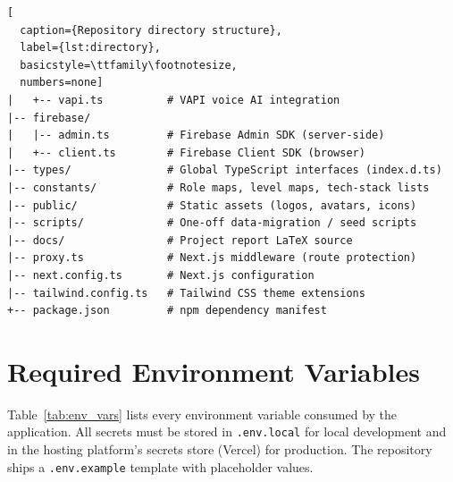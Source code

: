 \begin{lstlisting}[
  caption={Repository directory structure},
  label={lst:directory},
  basicstyle=\ttfamily\footnotesize,
  numbers=none]
|   +-- vapi.ts          # VAPI voice AI integration
|-- firebase/
|   |-- admin.ts         # Firebase Admin SDK (server-side)
|   +-- client.ts        # Firebase Client SDK (browser)
|-- types/               # Global TypeScript interfaces (index.d.ts)
|-- constants/           # Role maps, level maps, tech-stack lists
|-- public/              # Static assets (logos, avatars, icons)
|-- scripts/             # One-off data-migration / seed scripts
|-- docs/                # Project report LaTeX source
|-- proxy.ts             # Next.js middleware (route protection)
|-- next.config.ts       # Next.js configuration
|-- tailwind.config.ts   # Tailwind CSS theme extensions
+-- package.json         # npm dependency manifest
\end{lstlisting}

\section{Required Environment Variables}
\label{app:env}

Table~\ref{tab:env_vars} lists every environment variable consumed by the
application.  All secrets must be stored in \texttt{.env.local} for local
development and in the hosting platform's secrets store (Vercel) for
production.  The repository ships a \texttt{.env.example} template with
placeholder values.

